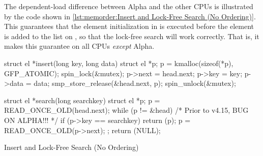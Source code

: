 \begin{fcvref}
The dependent-load difference between Alpha and the other CPUs is
illustrated by the code shown in
\cref{lst:memorder:Insert and Lock-Free Search (No Ordering)}.
This 
guarantees that the element initialization
in  is executed before the element is added to the
list on , so that the lock-free search will work correctly.
That is, it makes this guarantee on all CPUs {\em except} Alpha.
\end{fcvref}

\begin{listing}
\begin{fcvlabel}
\begin{VerbatimL}[commandchars=\\\[\]]
struct el *insert(long key, long data)
{
	struct el *p;
	p = kmalloc(sizeof(*p), GFP_ATOMIC);
	spin_lock(&mutex);
	p->next = head.next;		\lnlbl[init:b]
	p->key = key;
	p->data = data;			\lnlbl[init:e]
	smp_store_release(&head.next, p); \lnlbl[add]
	spin_unlock(&mutex);
}

struct el *search(long searchkey)
{
	struct el *p;
	p = READ_ONCE_OLD(head.next);	\lnlbl[h:next]
	while (p != &head) {
		/* Prior to v4.15, BUG ON ALPHA!!! */ \lnlbl[BUG]
		if (p->key == searchkey) {	\lnlbl[key]
			return (p);
		}
		p = READ_ONCE_OLD(p->next);	\lnlbl[next]
	};
	return (NULL);
}
\end{VerbatimL}
\end{fcvlabel}
\caption{Insert and Lock-Free Search (No Ordering)}
\label{lst:memorder:Insert and Lock-Free Search (No Ordering)}
\end{listing}


